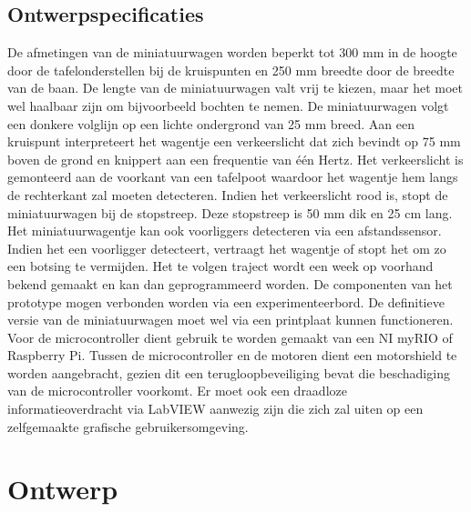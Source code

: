 \documentclass[a4paper,kulak]{kulakarticle}
\begin{document}
\subsection{Ontwerpspecificaties}
De afmetingen van de miniatuurwagen worden beperkt tot 300 mm in de hoogte door de tafelonderstellen bij de kruispunten en 250 mm breedte door de breedte van de baan. De lengte van de miniatuurwagen valt vrij te kiezen, maar het moet wel haalbaar zijn om bijvoorbeeld bochten te nemen. De miniatuurwagen volgt een donkere volglijn op een lichte ondergrond van 25 mm breed. Aan een kruispunt interpreteert het wagentje een verkeerslicht dat zich bevindt op 75 mm boven de grond en knippert aan een frequentie van één Hertz. Het verkeerslicht is gemonteerd aan de voorkant van een tafelpoot waardoor het wagentje hem langs de rechterkant zal moeten detecteren.  Indien het verkeerslicht rood is, stopt de miniatuurwagen bij de stopstreep. Deze stopstreep is 50 mm dik en 25 cm lang. Het miniatuurwagentje kan ook voorliggers detecteren via een afstandssensor. Indien het een voorligger detecteert, vertraagt het wagentje of stopt het om zo een botsing te
vermijden. Het te volgen traject wordt een week op voorhand bekend gemaakt en kan
dan geprogrammeerd worden. De componenten van het prototype mogen verbonden worden via een experimenteerbord. De definitieve versie van de miniatuurwagen moet wel via een printplaat kunnen functioneren. Voor de microcontroller dient gebruik te worden
gemaakt van een NI myRIO of Raspberry Pi. Tussen de microcontroller en de motoren dient een motorshield te worden aangebracht, gezien dit een terugloopbeveiliging
bevat die beschadiging van de microcontroller voorkomt. Er moet ook een draadloze informatieoverdracht via LabVIEW aanwezig zijn die zich zal uiten op een zelfgemaakte grafische gebruikersomgeving. 


\section{Ontwerp}
\end{document}
